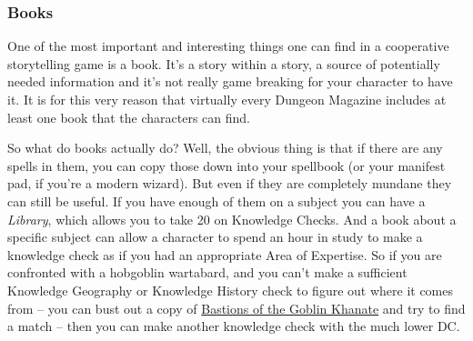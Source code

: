 \subsubsection{Books}

One of the most important and interesting things one can find in a cooperative storytelling game is a book. It's a story within a story, a source of potentially needed information and it's not really game breaking for your character to have it. It is for this very reason that virtually every Dungeon Magazine includes at least one book that the characters can find.

So what do books actually do? Well, the obvious thing is that if there are any spells in them, you can copy those down into your spellbook (or your  manifest pad, if you're a modern wizard). But even if they are completely mundane they can still be useful. If you have enough of them on a subject you can have a \textit{Library}, which allows you to take 20 on Knowledge Checks. And a book about a specific subject can allow a character to spend an hour in study to make a knowledge check as if you had an appropriate Area of Expertise. So if you are confronted with a hobgoblin wartabard, and you can't make a sufficient Knowledge Geography or Knowledge History check to figure out where it comes from -- you can bust out a copy of \underline{Bastions of the Goblin Khanate} and try to find a match -- then you can make another knowledge check with the much lower DC.\\

